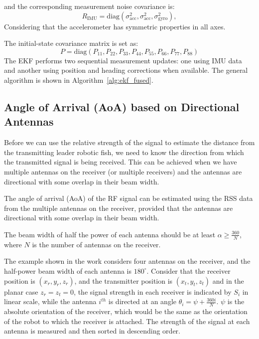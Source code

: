 \documentclass{ifacconf}
\begin{document}
and the corresponding measurement noise covariance is:
\begin{equation}
    R_{\text{IMU}} = \mathrm{diag}(\sigma_{\text{acc}}^2, \sigma_{\text{acc}}^2, \sigma_{\text{gyro}}^2),
\end{equation}
Considering that the accelerometer has symmetric properties in all axes. 

The initial-state covariance matrix is set as:
\begin{equation}
    P = \mathrm{diag}(P_{11}, P_{22}, P_{33}, P_{44}, P_{55}, P_{66}, P_{77}, P_{88})
\end{equation}
The EKF performs two sequential measurement updates: one using IMU data and another using position and heading corrections when available. The general algorithm is shown in Algorithm~\ref{alg:ekf_fused}.
\subsection{Angle of Arrival (AoA) based on Directional Antennas}
Before we can use the relative strength of the signal to estimate the distance from the transmitting leader robotic fish, we need to know the direction from which the transmitted signal is being received. This can be achieved when we have multiple antennas on the receiver (or multiple receivers) and the antennas are directional with some overlap in their beam width. 
\begin{lem}
The angle of arrival (AoA) of the RF signal can be estimated using the RSS data from the multiple antennas on the receiver, provided that the antennas are directional with some overlap in their beam width.
\end{lem}
\begin{lem}
The beam width of half the power of each antenna should be at least $\alpha \geq \frac{360}{N}$, where $N$ is the number of antennas on the receiver.
\end{lem}
The example shown in the work considers four antennas on the receiver, and the half-power beam width of each antenna is $180^{\circ}$. Consider that the receiver position is $(x_r, y_r, z_r)$, and the transmitter position is $(x_t, y_t, z_t)$ and in the planar case $z_r = z_t = 0$, the signal strength in each receiver is indicated by $S_i$ in linear scale, while the antenna $i^{th}$ is directed at an angle $ \theta_i = \psi + \frac{360i}{N}$. $\psi$ is the absolute orientation of the receiver, which would be the same as the orientation of the robot to which the receiver is attached. 
The strength of the signal at each antenna is measured and then sorted in descending order. 
\end{document}

